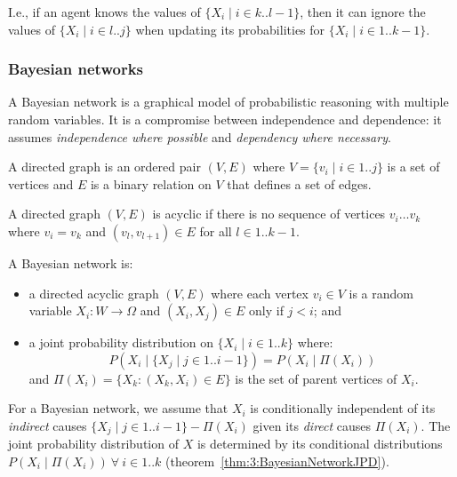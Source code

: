I.e., if an agent knows the values of $\{ X_i \mid i \in k .. l - 1 \}$, then
it can ignore the values of $\{ X_i \mid i \in l .. j \}$ when updating its
probabilities for $\{ X_i \mid i \in 1 .. k - 1 \}$.

\subsubsection{Bayesian networks}

A Bayesian network is a graphical model of probabilistic reasoning with multiple
random variables.
It is a compromise between independence and dependence: it assumes
\textit{independence where possible} and \textit{dependency where necessary}.

\begin{dfn}
  A directed graph is an ordered pair $(V, E)$ where
  $V = \{ v_i \mid i \in 1 .. j \}$ is a set of vertices and $E$ is a binary
  relation on $V$ that defines a set of edges.
\end{dfn}

\begin{dfn}
  A directed graph $(V, E)$ is acyclic if there is no sequence of vertices
  $v_i \ldots v_k$ where $v_i = v_k$ and $(v_l, v_{l + 1}) \in E$ for all
  $l \in 1 .. k - 1$.
\end{dfn}

\begin{dfn}
  \label{def:3:BayesianNetwork}
  A Bayesian network is:
  \begin{itemize}
    \item a directed acyclic graph $(V, E)$ where each vertex $v_i \in V$ is a
          random variable $X_i : W \to \Omega$ and $(X_i, X_j) \in E$
          only if $j < i$; and
    \item a joint probability distribution on $\{ X_i \mid i \in 1 .. k \}$
          where:
          \begin{equation}
            P(X_i \mid \{ X_j \mid j \in 1 .. i - 1 \})
            = P(X_i \mid \Pi(X_i))
          \end{equation}
          and $\Pi(X_i) = \{ X_k : (X_k, X_i) \in E \}$ is the set of parent
          vertices of $X_i$.
  \end{itemize}
\end{dfn}

For a Bayesian network, we assume that $X_i$ is conditionally independent of its
\textit{indirect} causes $\{ X_j \mid j \in 1 .. i - 1 \} - \Pi(X_i)$ given its
\textit{direct} causes $\Pi(X_i)$.
The joint probability distribution of $X$ is determined by its conditional
distributions $P(X_i \mid \Pi(X_i)) \ \forall\ i \in 1 .. k$
(theorem~\ref{thm:3:BayesianNetworkJPD}).

